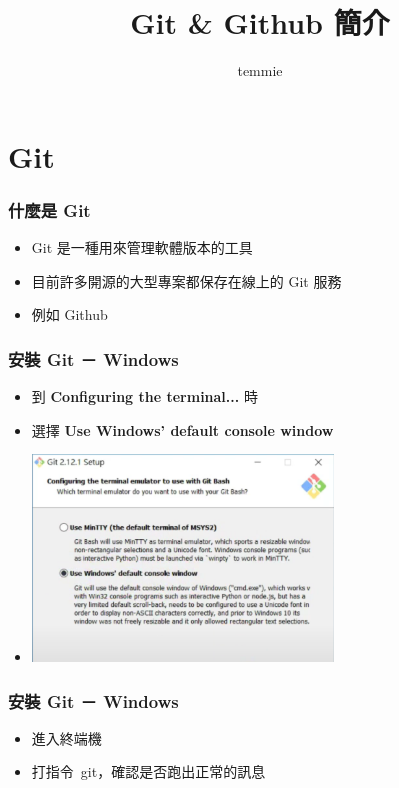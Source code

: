 \documentclass[mathserif]{beamer}
\title{Git \& Github 簡介}
\author{temmie}
\date{}
\begin{document}
\begin{frame}
    \titlepage
\end{frame}

\begin{frame}
    \tableofcontents
\end{frame}

\section{Git}

\begin{frame}
    \frametitle{什麼是 Git}
    \begin{itemize}
        \item Git 是一種用來管理軟體版本的工具
        \item 目前許多開源的大型專案都保存在線上的 Git 服務
        \item 例如 Github
    \end{itemize}
\end{frame}

\begin{frame}
    \frametitle{安裝 Git － Windows}
    \begin{itemize}
        \item 到 \textbf{Configuring the terminal...} 時
        \item 選擇 \textbf{Use Windows' default console window}
        \item \includegraphics[width=8.0cm]{img/download.jpg}
    \end{itemize}
\end{frame}

\begin{frame}
    \frametitle{安裝 Git － Windows}
    \begin{itemize}
        \item 進入終端機
        \item 打指令\ {\color{red}git}，確認是否跑出正常的訊息
    \end{itemize}
\end{frame}
\end{document}

